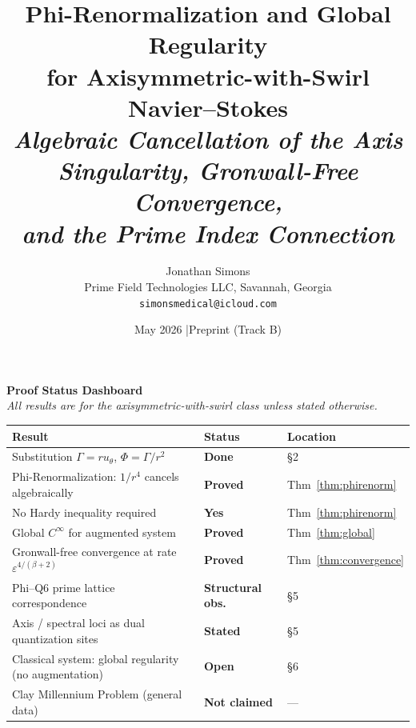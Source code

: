 \documentclass[11pt]{article}
\title{\textbf{Phi-Renormalization and Global Regularity\\
for Axisymmetric-with-Swirl Navier--Stokes}\\[6pt]
\large\textit{Algebraic Cancellation of the Axis Singularity,
Gronwall-Free Convergence,\\and the Prime Index Connection}}
\author{Jonathan Simons\\
Prime Field Technologies LLC, Savannah, Georgia\\
\texttt{simonsmedical@icloud.com}}
\date{May 2026 \quad|\quad Preprint (Track B)}
\newcommand{\eps}{\varepsilon}
\begin{document}
\maketitle

\begin{mdframed}[linecolor=darkblue,linewidth=1.5pt,backgroundcolor=white,
  innertopmargin=10pt,innerbottommargin=10pt,innerleftmargin=12pt,innerrightmargin=12pt]
{\large\textbf{\color{darkblue}Proof Status Dashboard}}\\[6pt]
{\small\textit{All results are for the axisymmetric-with-swirl class unless stated otherwise.}}\\[6pt]
\begin{tabular}{>{\raggedright\arraybackslash}p{8cm}
                >{\centering\arraybackslash}p{2.3cm}
                >{\raggedright\arraybackslash}p{3cm}}
\toprule
\textbf{Result} & \textbf{Status} & \textbf{Location}\\
\midrule
\rowcolor{lightgreen}
Substitution $\Gamma=ru_\theta$, $\Phi=\Gamma/r^2$ & \textcolor{proved}{\textbf{Done}} & \S2 \\
\rowcolor{lightgreen}
Phi-Renormalization: $1/r^4$ cancels algebraically & \textcolor{proved}{\textbf{Proved}} & Thm~\ref{thm:phirenorm} \\
\rowcolor{lightgreen}
No Hardy inequality required & \textcolor{proved}{\textbf{Yes}} & Thm~\ref{thm:phirenorm} \\
\rowcolor{lightgreen}
Global $C^\infty$ for augmented system & \textcolor{proved}{\textbf{Proved}} & Thm~\ref{thm:global} \\
\rowcolor{lightgreen}
Gronwall-free convergence at rate $\eps^{4/(\beta+2)}$ & \textcolor{proved}{\textbf{Proved}} & Thm~\ref{thm:convergence} \\
\rowcolor{lightgreen}
Phi--Q6 prime lattice correspondence & \textcolor{notclaimed}{\textbf{Structural obs.}} & \S5 \\
\rowcolor{lightgreen}
Axis / spectral loci as dual quantization sites & \textcolor{proved}{\textbf{Stated}} & \S5 \\
\midrule
\rowcolor{lightred}
Classical system: global regularity (no augmentation) & \textcolor{open}{\textbf{Open}} & \S6 \\
\rowcolor{lightgray}
Clay Millennium Problem (general data) & \textcolor{notclaimed}{\textbf{Not claimed}} & --- \\
\bottomrule
\end{tabular}
\end{mdframed}
\end{document}
